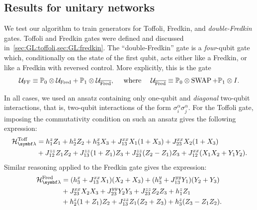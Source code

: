 \subsection{Results for unitary networks}
\label{subsec:GL:supervised_learning_results_noancillae}

We test our algorithm to train generators for Toffoli, Fredkin, and \emph{double-Fredkin} gates.
Toffoli and Fredkin gates were defined and discussed in~\cref{sec:GL:toffoli,sec:GL:fredkin}.
The ``double-Fredkin'' gate is a \emph{four}-qubit gate which, conditionally on the state of the first qubit, acts either like a Fredkin, or like a Fredkin with reversed control. More explicitly, this is the gate
\begin{equation}
    {\mathcal{U}}_{\operatorname{FF}} \equiv {\mathbb{P}}_0\otimes {\mathcal{U}}_{\operatorname{Fred}} + {\mathbb{P}}_1\otimes {\mathcal{U}}_{\overline{\operatorname{Fred}}},
    \quad\text{ where }\quad
    {\mathcal{U}}_{\overline{\operatorname{Fred}}} \equiv {\mathbb{P}}_0\otimes \operatorname{SWAP} + {\mathbb{P}}_1\otimes I.
\end{equation}

In all cases, we used an ansatz containing only one-qubit and \emph{diagonal} two-qubit interactions, that is, two-qubit interactions of the form $\sigma_i^\alpha\sigma_j^\alpha$.
For the Toffoli gate, imposing the commutativity condition on such an ansatz gives the following expression:
\begin{equation}
\begin{aligned}
    \calH_\bslambda^{\on{Toff}} &=
    h_1^z Z_1 + h_2^z Z_2 + h_3^x X_3 +
    J_{13}^{xx} X_1(1+X_3) +
    J_{23}^{xx} X_2(1+X_3) \\
    &+ J_{12}^{zz} Z_1 Z_2 +
    J_{13}^{zz} (1+Z_1)Z_3 +
    J_{23}^{zz} (Z_2 - Z_1)Z_3 +
    J_{12}^{xx} (X_1 X_2 + Y_1 Y_2).
\end{aligned}
\label{eq:GL:toffoli_reducd_ansatz_for_ML}
\end{equation}
Similar reasoning applied to the Fredkin gate gives the expression:
\begin{equation}
\begin{aligned}
    \calH_\bslambda^{\on{Fred}} &=
    (h_3^x + J_{13}^{xx} X_1) (X_2 + X_3)
    + (h_3^y + J_{13}^{yy} Y_1) (Y_2 + Y_3) \\
    &+ J_{23}^{xx} X_2 X_3
    + J_{23}^{yy} Y_2 Y_3
    + J_{23}^{zz} Z_2 Z_3
    + h_1^z Z_1
    \\
    &+ h_2^z (1 + Z_1) Z_2
    + J_{13}^{zz} Z_1 (Z_2 + Z_3)
    + h_3^z (Z_3 - Z_1 Z_2).
\end{aligned}
\end{equation}

